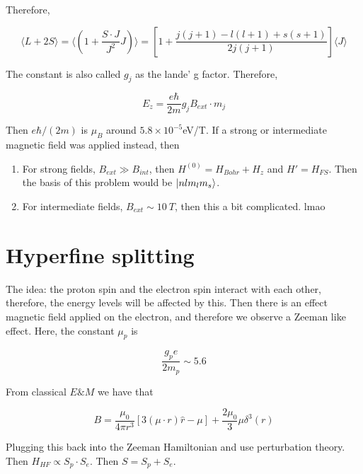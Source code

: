 \documentclass{article}
\newtheorem{one minute paper}[theorem]{One Minute Paper}
\begin{document}
Therefore, 

\begin{equation}
    \langle L + 2S \rangle = \langle \left( 1 + \frac{S \cdot J}{J^2}J \right)\rangle = \left[ 1 + \frac{j(j+1) - l(l+1) + s(s+1)}{2j(j+1)} \right] \langle J \rangle 
\end{equation}

The constant is also called $g_j$ as the lande' g factor. Therefore, 

\begin{equation}
    E_z = \frac{e\hbar}{2m}g_j B_{ext} \cdot m_j
\end{equation}

Then $e\hbar/(2m)$ is $\mu_B$ around $5.8 \times 10^{-5}$eV/T. If a strong or intermediate magnetic field was applied instead, then 

\begin{enumerate}
    \item For strong fields, $B_{ext} \gg B_{int}$, then $H^{(0)} = H_{Bohr} + H_z$ and $H' = H_{FS}$. Then the basis of this problem would be $\ket{nlm_lm_s}$.
    \item For intermediate fields, $B_{ext} \sim 10~T$, then this a bit complicated. lmao 
\end{enumerate}

\section*{Hyperfine splitting}

The idea: the proton spin and the electron spin interact with each other, therefore, the energy levels will be affected by this. Then there is an effect magnetic field applied on the electron, and 
therefore we observe a Zeeman like effect. Here, the constant $\mu_p$ is 

\begin{equation}
    \frac{g_{p}e}{2m_p} \sim 5.6 
\end{equation}

From classical $E\&M$ we have that 

\begin{equation}
    B = \frac{\mu_0}{4\pi r^3}\left[ 3(\mu \cdot r)\hat{r} - \mu\right] + \frac{2\mu_0}{3}\mu \delta^3(r)
\end{equation}

Plugging this back into the Zeeman Hamiltonian and use perturbation theory. Then $H_{HF} \propto S_p \cdot S_e$. Then $S = S_p + S_e$.  
\end{document}
